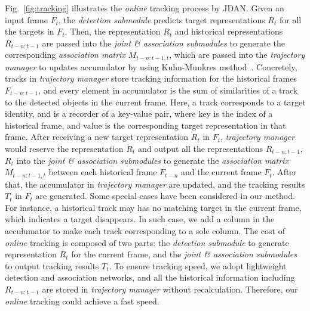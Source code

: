 \documentclass[acmsmall]{acmart}
\begin{document}
{
Fig.~\ref{fig:tracking} illustrates the \emph{online} tracking process by JDAN.
Given an input frame $F_t$, the \emph{detection submodule} predicts target representations $R_t$ for all the targets in $F_t$.
Then, the representation $R_t$ and historical representations $R_{t-n:t-1}$ are passed into the \emph{joint \& association submodules} to generate the corresponding \emph{association matrix} $M_{t-n:t-1,t}$, which are passed into the \emph{trajectory manager} to updates accumulator by using Kuhn-Munkres method~\cite{Munkres1957}. 
Concretely, tracks in \emph{trajectory manager} store tracking information for the historical frames $F_{t-n:t-1}$, 
and every element in accumulator is the sum of similarities of a track to the detected objects in the current frame. 
Here, a track corresponds to a target identity, and is a recorder of a key-value pair, where key is the index of a historical frame, and value is the corresponding target representation in that frame.
After receiving a new target representation $R_t$ in $F_t$, \emph{trajectory manager} would reserve the representation $R_t$ and output all the representations $R_{t-n:t-1}$, $R_t$ into the \emph{joint \& association submodules} to generate the \emph{association matrix} $M_{t-n:t-1,t}$ between each historical frame $F_{t-n}$ and the current frame $F_t$.
After that, the accumulator in \emph{trajectory manager} are updated, and the tracking results $T_t$ in $F_t$ are generated.
}
{
Some special cases have been considered in our method.
For instance, a historical track may has no matching target in the current frame, which indicates a target disappears.
In such case, we add a column in the acculumator to make each track corresponding to a sole column.
% 
The cost of \emph{online} tracking is composed of two parts: 
the \emph{detection submodule} to generate representation $R_t$ for the current frame, and the \emph{joint \& association submodules} to output tracking results $T_t$.
To ensure tracking speed, we adopt lightweight detection and association networks, and all the historical information including $R_{t-n:t-1}$ are stored in \emph{trajectory manager} without recalculation.
Therefore, our \emph{online} tracking could achieve a fast speed.
}



\end{document}
